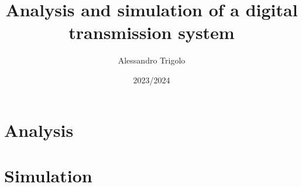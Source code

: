 \documentclass{article}
\title{\vspace{160px} \textbf{\huge{Analysis and simulation of a digital transmission system}}}
\author{\Large{Alessandro Trigolo}}
\date{2023/2024}
\begin{document}
\maketitle
\thispagestyle{empty}
\newpage

\tableofcontents \newpage

\listoftodos \newpage






\newpage \part{Analysis}




% 





\newpage \part{Simulation}












\end{document}
